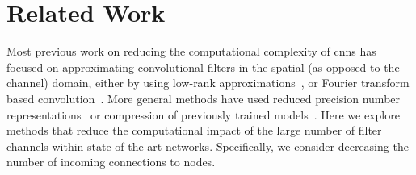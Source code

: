 \documentclass[thesis]{subfiles}
\begin{document}
	\section{Related Work}\label{previouswork}
	Most previous work on reducing the computational complexity of \glspl{cnn} has focused on approximating convolutional filters in the spatial (as opposed to the channel) domain, either by using low-rank approximations~\citep{mamalet2012simplifying,journals/corr/JaderbergVZ14, journals/pami/SironiTRLF15, journals/corr/LebedevGROL14, Ioannou2016}, or Fourier transform based convolution~\citep{mathieu2013fast, rippel2015spectral}. More general methods have used reduced precision number representations~\citep{1502.02551v1} or compression of previously trained models~\citep{Chen2015,Kim2016}. Here we explore methods that reduce the computational impact of the large number of filter channels within state-of-the art networks. Specifically, we consider decreasing the number of incoming connections to nodes.
	
\end{document}
